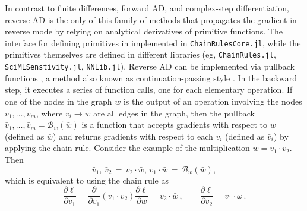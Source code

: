 In contrast to finite differences, forward AD, and complex-step differentiation, reverse AD is the only of this family of methods that propagates the gradient in reverse mode by relying on analytical derivatives of primitive functions.
The interface for defining primitives in implemented in \texttt{ChainRulesCore.jl}, while the primitives themselves are defined in different libraries (eg, \texttt{ChainRules.jl}, \texttt{SciMLSenstivity.jl}, \texttt{NNLib.jl}). 
Reverse AD can be implemented via pullback functions \cite{Innes_2018}, a method also known as continuation-passing style \cite{Wang_Zheng_Decker_Wu_Essertel_Rompf_2019}.
In the backward step, it executes a series of function calls, one for each elementary operation.
If one of the nodes in the graph $w$ is the output of an operation involving the nodes $v_1, \ldots, v_m$, where $v_i \rightarrow w$ are all edges in the graph, then the pullback $\bar v_1, \ldots, \bar v_m = \mathcal B_w(\bar w)$ is a function that accepts gradients with respect to $w$ (defined as $\bar w$) and returns gradients with respect to each $v_i$ (defined as $\bar v_i$) by applying the chain rule. 
Consider the example of the multiplication $w = v_1 \cdot v_2$. 
Then
\begin{equation}
 \bar v_1, \, \bar v_2 
 \,=\,
 v_2 \cdot \bar w , \,
 v_1 \cdot \bar w 
 \,=\,
 \mathcal{B}_w (\bar w),
\end{equation}
which is equivalent to using the chain rule as
\begin{equation}
 \frac{\partial \ell}{\partial v_1} 
 = \frac{\partial}{\partial v_1}(v_1 \cdot v_2) \frac{\partial \ell}{\partial w}
 =
 v_2 \cdot \bar w \, , \qquad 
 \frac{\partial \ell}{\partial v_2} = v_1 \cdot \bar \omega \, .
\end{equation}

